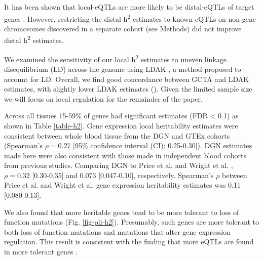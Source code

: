 \documentclass[10pt,letterpaper]{article}
\begin{document}
It has been shown that local-eQTLs are more likely to be distal-eQTLs of target genes \cite{pierce2014mediation}. However, restricting the distal h\textsuperscript{2} estimates to known eQTLs  on non-gene chromosomes discovered in a separate cohort (see Methods) did not improve distal h\textsuperscript{2} estimates. %

We examined the sensitivity of our local h\textsuperscript{2} estimates to uneven linkage disequilibrium (LD) across the genome using LDAK \cite{speed2012improved}, a method proposed to account for LD. Overall, we find good concordance between GCTA and LDAK estimates, with slightly lower LDAK estimates (). Given the limited sample size we will focus on local regulation for the remainder of the paper.

Across all tissues 15-59\% of genes had significant estimates (FDR \textless{} 0.1)  as shown in Table \ref{table-h2}. Gene expression local heritability estimates were consistent between whole blood tissue from the DGN and GTEx cohorts (Spearman's $\rho = 0.27$ [95\% confidence interval (CI): 0.25-0.30]). DGN estimates made here were also consistent with those made in independent blood cohorts from previous studies. Comparing DGN to Price et al. \cite{Price_2011} and Wright et al. \cite{Wright_2014}, $\rho = 0.32$ [0.30-0.35] and 0.073 [0.047-0.10], respectively. Spearman's $\rho$ between Price et al. \cite{Price_2011} and Wright et al. \cite{Wright_2014} gene expression heritability estimates was 0.11 [0.080-0.13].

We also found that more heritable genes tend to be more tolerant to loss of function mutations (Fig. \ref{fig-pli-h2}). Presumably, such genes are more tolerant to both loss of function mutations and mutations that alter gene expression regulation. This result is consistent with the finding that more eQTLs are found in more tolerant genes \cite{lek2016analysis}.
\end{document}
